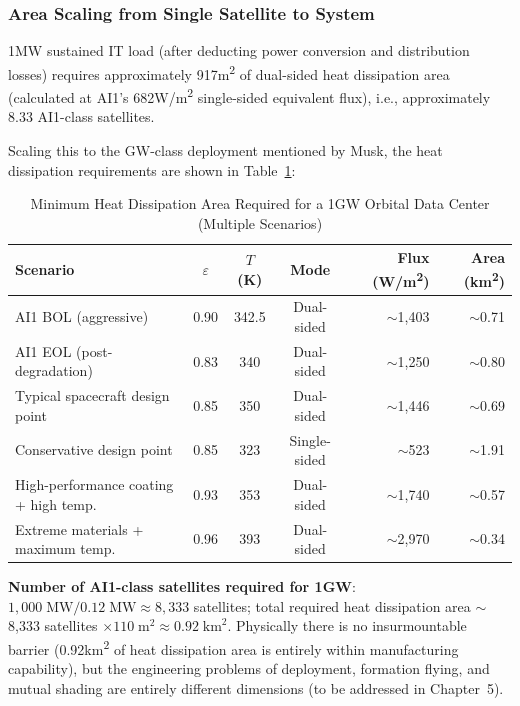 \subsubsection{Area Scaling from Single Satellite to System}

1\;MW sustained IT load (after deducting power conversion and distribution losses) requires approximately 917\;m\textsuperscript{2} of dual-sided heat dissipation area (calculated at AI1's 682\;W/m\textsuperscript{2} single-sided equivalent flux), i.e., approximately 8.33 AI1-class satellites.

Scaling this to the GW-class deployment mentioned by Musk, the heat dissipation requirements are shown in Table~\ref{tab:gigawatt_area}:

\begin{table}[H]
\centering
\caption{Minimum Heat Dissipation Area Required for a 1\;GW Orbital Data Center (Multiple Scenarios)}
\label{tab:gigawatt_area}
\footnotesize
\begin{tabular}{lcccrr}
\toprule
\textbf{Scenario} & $\varepsilon$ & $T$ (K) & \textbf{Mode} & \textbf{Flux (W/m\textsuperscript{2})} & \textbf{Area (km\textsuperscript{2})} \\
\midrule
AI1 BOL (aggressive)     & 0.90 & 342.5 & Dual-sided & $\sim$1,403 & $\sim$0.71 \\
AI1 EOL (post-degradation) & 0.83 & 340   & Dual-sided & $\sim$1,250 & $\sim$0.80 \\
Typical spacecraft design point & 0.85 & 350   & Dual-sided & $\sim$1,446 & $\sim$0.69 \\
Conservative design point       & 0.85 & 323   & Single-sided & $\sim$523   & $\sim$1.91 \\
High-performance coating + high temp. & 0.93 & 353   & Dual-sided & $\sim$1,740 & $\sim$0.57 \\
Extreme materials + maximum temp.     & 0.96 & 393   & Dual-sided & $\sim$2,970 & $\sim$0.34 \\
\bottomrule
\end{tabular}
\end{table}

\textbf{Number of AI1-class satellites required for 1\;GW}: $1,000\;\text{MW} / 0.12\;\text{MW} \approx 8,333$ satellites; total required heat dissipation area $\sim$8,333 satellites $\times 110\;\text{m}^2 \approx 0.92\;\text{km}^2$. Physically there is no insurmountable barrier (0.92\;km\textsuperscript{2} of heat dissipation area is entirely within manufacturing capability), but the engineering problems of deployment, formation flying, and mutual shading are entirely different dimensions (to be addressed in Chapter~5).

